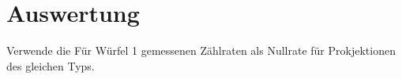 \section{Auswertung}
\label{sec:Auswertung}


Verwende die Für Würfel 1 gemessenen Zählraten als Nullrate für Prokjektionen des gleichen Typs.
